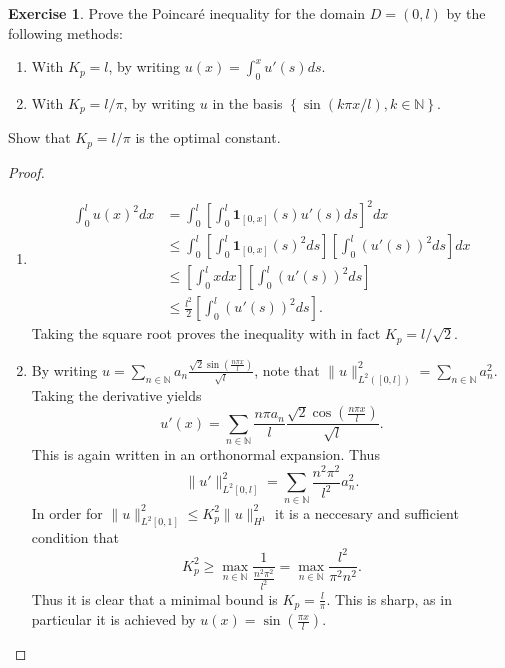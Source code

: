 \documentclass{amsart}
\theoremstyle{plain}
\theoremstyle{definition}
\newtheorem{exer}{Exercise}[section]
\newcommand{\N}{\mathbb{N}}
\begin{document}
\begin{exer}
Prove the Poincaré inequality for the domain $D =(0, l)$ by the following methods:
    \begin{enumerate}[label=\alph*.]
        \item With $K_p = l$, by writing $u(x) = \int_{0}^{x} u'(s) ds.$
        \item With $K_p = l/\pi$, by writing $u$ in the basis $\left\{\sin\left(k\pi x/l\right), k\in \N\right\}.$
    \end{enumerate}
    Show that $K_p = l/\pi$ is the optimal constant. 
\end{exer}
\begin{proof}
    \begin{enumerate}[label=\alph*.]
        \item 
        \begin{align*}
            \int_0^{l} u(x)^2 dx &= \int_0^l \left[\int_{0}^{l} \mathbf{1}_{[0,x]}(s) u'(s) ds \right]^2 dx\\
            &\leq  \int_0^l \left[\int_{0}^{l} \mathbf{1}_{[0,x]}(s)^2 ds \right] \left[\int_0^l \left(u'(s)\right)^2 ds \right]dx\\
            &\leq \left[\int_0^l x dx\right]\left[\int_0^l \left(u'(s)\right)^2 ds \right]\\
            &\leq \frac{l^2}{2}\left[\int_0^l \left(u'(s)\right)^2 ds \right].
        \end{align*}
        Taking the square root proves the inequality with in fact $K_p =l/\sqrt{2}.$
        \item By writing $u = \sum_{n\in\N} a_n \frac{\sqrt{2}\sin\left(\frac{n \pi x}{l}\right)}{\sqrt{l}}$, note that $\|u\|_{L^2([0,l])}^2 = \sum_{n\in \N} a_n^2$. Taking the derivative yields 
        $$u'(x) = \sum_{n\in \N} \frac{n\pi a_n}{l} \frac{\sqrt{2}\cos\left(\frac{n\pi x}{l}\right)}{\sqrt{l}}.$$
        This is again written in an orthonormal expansion. Thus 
        $$\|u'\|_{L^{2}[0,l]}^2 = \sum_{n\in \N} \frac{n^2 \pi^2 }{l^2}a_n^2.$$ 
        In order for $\|u\|^2_{L^{2}[0,1]} \leq K_p^2 \|u\|_{H^1}^2$ it is a neccesary and sufficient condition that $$K_p^2 \geq \max_{n\in \N} \frac{1}{\frac{n^2\pi^2}{l^2}} = \max_{n\in \N} \frac{l^2}{\pi^2 n^2}.$$
        Thus it is clear that a minimal bound is $K_p = \frac{l}{\pi}.$ This is sharp, as in particular it is achieved by $u(x) = \sin\left(\frac{\pi x}{l}\right).$
    \end{enumerate}
\end{proof}
\end{document}
